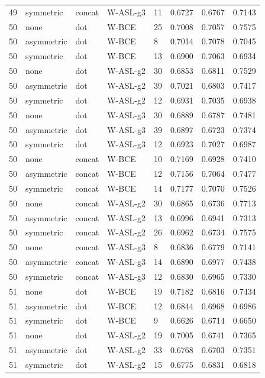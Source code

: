 \begin{longtable}{rllllrrr}
49 & symmetric & concat & W-ASL-g3 & 11 & 0.6727 & 0.6767 & 0.7143 \\
50 & none & dot & W-BCE & 25 & 0.7008 & 0.7057 & 0.7575 \\
50 & asymmetric & dot & W-BCE & 8 & 0.7014 & 0.7078 & 0.7045 \\
50 & symmetric & dot & W-BCE & 13 & 0.6900 & 0.7063 & 0.6934 \\
50 & none & dot & W-ASL-g2 & 30 & 0.6853 & 0.6811 & 0.7529 \\
50 & asymmetric & dot & W-ASL-g2 & 39 & 0.7021 & 0.6803 & 0.7417 \\
50 & symmetric & dot & W-ASL-g2 & 12 & 0.6931 & 0.7035 & 0.6938 \\
50 & none & dot & W-ASL-g3 & 30 & 0.6889 & 0.6787 & 0.7481 \\
50 & asymmetric & dot & W-ASL-g3 & 39 & 0.6897 & 0.6723 & 0.7374 \\
50 & symmetric & dot & W-ASL-g3 & 12 & 0.6923 & 0.7027 & 0.6987 \\
50 & none & concat & W-BCE & 10 & 0.7169 & 0.6928 & 0.7410 \\
50 & asymmetric & concat & W-BCE & 12 & 0.7156 & 0.7064 & 0.7477 \\
50 & symmetric & concat & W-BCE & 14 & 0.7177 & 0.7070 & 0.7526 \\
50 & none & concat & W-ASL-g2 & 30 & 0.6865 & 0.6736 & 0.7713 \\
50 & asymmetric & concat & W-ASL-g2 & 13 & 0.6996 & 0.6941 & 0.7313 \\
50 & symmetric & concat & W-ASL-g2 & 26 & 0.6962 & 0.6734 & 0.7575 \\
50 & none & concat & W-ASL-g3 & 8 & 0.6836 & 0.6779 & 0.7141 \\
50 & asymmetric & concat & W-ASL-g3 & 14 & 0.6890 & 0.6977 & 0.7438 \\
50 & symmetric & concat & W-ASL-g3 & 12 & 0.6830 & 0.6965 & 0.7330 \\
51 & none & dot & W-BCE & 19 & 0.7182 & 0.6816 & 0.7434 \\
51 & asymmetric & dot & W-BCE & 12 & 0.6844 & 0.6968 & 0.6986 \\
51 & symmetric & dot & W-BCE & 9 & 0.6626 & 0.6714 & 0.6650 \\
51 & none & dot & W-ASL-g2 & 19 & 0.7005 & 0.6741 & 0.7365 \\
51 & asymmetric & dot & W-ASL-g2 & 33 & 0.6768 & 0.6703 & 0.7351 \\
51 & symmetric & dot & W-ASL-g2 & 15 & 0.6775 & 0.6831 & 0.6818 \\

\end{longtable}
